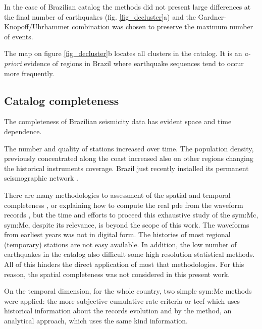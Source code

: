 \documentclass[draft, grl]{agutex}
\begin{document}
\begin{article}
In the case of Brazilian catalog the methods did not present large differences at the final number of earthquakes (fig. \ref{fig_decluster}a) and the Gardner-Knopoff/Uhrhammer combination was chosen to preserve the maximum number of events.

The map on figure \ref{fig_decluster}b locates all clusters in the catalog. It is an \emph{a-priori} evidence of regions in Brazil where earthquake sequences tend to occur more frequently.


\subsection{Catalog completeness}

The completeness of Brazilian seismicity data has evident space and time dependence.

The number and quality of stations increased over time. The population density, previously concentrated along the coast increased also on other regions changing the historical instruments coverage. Brazil just recently installed its permanent seismographic network \citep{pirchiner_2011}.

There are many methodologies to assessment of the spatial and temporal completeness \citep{mignan_2014, vorobieva_2013, nasir_2013, mignan_2013, mignan_2012,  mignan_woessner_2012, mignan_2011, woessner_2005, stucchi_2004, cao_gao_2002, wiemer_wyss_2000, ogata_1993, stepp_1972}, or explaining how to compute the real \gls{pde} from the waveform records \citep{schorlemmer_2008}, but the time and efforts to proceed this exhaustive study of the \glsdesc{sym:Mc}, \gls{sym:Mc}, despite its relevance, is beyond the scope of this work. The waveforms from earliest years was not in digital form. The histories of most regional (temporary) stations are not easy available. In addition, the low number of earthquakes in the catalog also difficult some high resolution statistical methods. All of this hinders the direct application of most that methodologies. For this reason, the spatial completeness was not considered in this present work. 

On the temporal dimension, for the whole country, two simple \gls{sym:Mc} methods were applied: the more subjective cumulative rate criteria or \gls{tcef} \citep{nasir_2013} which uses historical information about the records evolution and by the \citet{stepp_1972} method, an analytical approach, which uses the same kind information.


\end{article}
\end{document}
